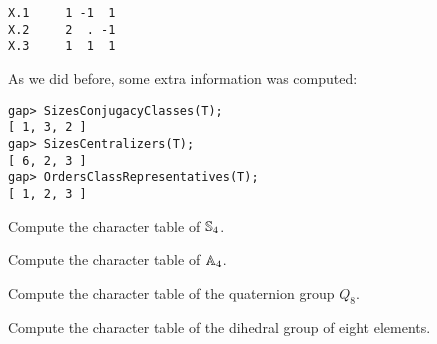 \begin{example}
\begin{lstlisting}
X.1     1 -1  1
X.2     2  . -1
X.3     1  1  1
\end{lstlisting}
%
%
%            
%            
As we did before, some extra information was computed:
%
%
\begin{lstlisting}
gap> SizesConjugacyClasses(T);
[ 1, 3, 2 ]
gap> SizesCentralizers(T);
[ 6, 2, 3 ]
gap> OrdersClassRepresentatives(T);
[ 1, 2, 3 ]
\end{lstlisting}
\end{example}

\begin{exercise}
    Compute the character table of $\mathbb{S}_4$. 
\end{exercise}

\begin{exercise}
    Compute the character table of $\mathbb{A}_4$. 
\end{exercise}

\begin{exercise}
    Compute the character table of the quaternion group $Q_8$.
\end{exercise}

\begin{exercise}
    Compute the character table of the 
    dihedral group of eight elements. 
\end{exercise}

